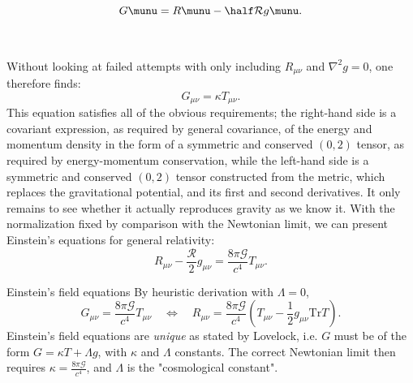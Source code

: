 \begin{equation}
	G\munu = R\munu -\half \mathcal{R}g\munu.
\end{equation}\\
\\
Without looking at failed attempts with only including $R_{\mu \nu}$ and $\nabla^2 g = 0$, one therefore finds:
\begin{equation}
	G_{\mu \nu} = \kappa T_{\mu \nu}.
\end{equation}
This equation satisfies all of the obvious requirements;
the right-hand side is a covariant expression, as required by general covariance, of the energy and momentum density in the form of a symmetric and conserved $(0, 2)$ tensor, as required by energy-momentum conservation, while the left-hand side is a symmetric and
conserved $(0, 2)$ tensor constructed from the metric, which replaces the gravitational potential, and its first and second derivatives. It
only remains to see whether it actually reproduces gravity as we know it.
With the normalization fixed by comparison
with the Newtonian limit, we can present Einstein’s equations for general relativity:
\begin{equation}
	R_{\mu \nu} - \frac{\mathcal{R}}{2} g_{ \mu \nu } = \frac{8 \pi \mathcal{G}}{c^4} T_{\mu \nu}.
\end{equation}
\begin{mybox}{Einstein's field equations}
	By heuristic derivation with $\Lambda=0$,
	\begin{equation}
	\label{eq:einsteinfieldeqs}
	G_{\mu \nu}=\frac{8 \pi \mathcal{G}}{c^4} T_{\mu \nu} \quad \Leftrightarrow \quad R_{\mu \nu}=\frac{8 \pi \mathcal{G}}{c^4} \left(T_{\mu \nu}-\frac{1}{2} g_{\mu \nu} \mathrm{Tr}T\right).
	\end{equation}
	Einstein's field equations are \emph{unique} as stated by Lovelock, i.e. $G$ must be of the form $G=\kappa T+\Lambda g$, with $\kappa$ and $\Lambda$ constants. The correct Newtonian limit then requires $\kappa = \frac{8 \pi \mathcal{G}}{c^4}$, and $\Lambda$ is the "cosmological constant".
	
\end{mybox}

